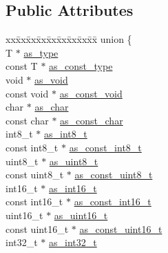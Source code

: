\subsection*{Public Attributes}
\begin{DoxyCompactItemize}
\item 
\begin{tabbing}
xx\=xx\=xx\=xx\=xx\=xx\=xx\=xx\=xx\=\kill
union \{\\
\>T $\ast$ \hyperlink{structcrap_1_1pointer__t_a345d4e69dd07c3dcaacbb462f3d67745}{as\_type}\\
\>const T $\ast$ \hyperlink{structcrap_1_1pointer__t_af40ed86c734355aefae597dd8882386c}{as\_const\_type}\\
\>void $\ast$ \hyperlink{structcrap_1_1pointer__t_a60272c75c04aaafaf6a4339f10d81b32}{as\_void}\\
\>const void $\ast$ \hyperlink{structcrap_1_1pointer__t_a76da0338043bbfc7ed947f18ae843d52}{as\_const\_void}\\
\>char $\ast$ \hyperlink{structcrap_1_1pointer__t_adc5e76f4d3e2f3242b0e0c128e3a018e}{as\_char}\\
\>const char $\ast$ \hyperlink{structcrap_1_1pointer__t_ad90d5ba7cd8c0996aaa5d6ac8e59197d}{as\_const\_char}\\
\>int8\_t $\ast$ \hyperlink{structcrap_1_1pointer__t_a00a337da13cb56f4f649c524af7606b1}{as\_int8\_t}\\
\>const int8\_t $\ast$ \hyperlink{structcrap_1_1pointer__t_a9ce77bbce5a72d780ed726c9c91549d9}{as\_const\_int8\_t}\\
\>uint8\_t $\ast$ \hyperlink{structcrap_1_1pointer__t_abc75378cf1e3c1cb65e93c1a765a5c0b}{as\_uint8\_t}\\
\>const uint8\_t $\ast$ \hyperlink{structcrap_1_1pointer__t_a9501aed2048dbef966d66362b39bc3fe}{as\_const\_uint8\_t}\\
\>int16\_t $\ast$ \hyperlink{structcrap_1_1pointer__t_af49743e61d30272abb1a93697114aaa9}{as\_int16\_t}\\
\>const int16\_t $\ast$ \hyperlink{structcrap_1_1pointer__t_ae390d11f93bef65281220f053dae1b09}{as\_const\_int16\_t}\\
\>uint16\_t $\ast$ \hyperlink{structcrap_1_1pointer__t_a9c9b5ae3d6475830d13c0ab770b9d056}{as\_uint16\_t}\\
\>const uint16\_t $\ast$ \hyperlink{structcrap_1_1pointer__t_a7404877008ee5b52b04d2278c02987ed}{as\_const\_uint16\_t}\\
\>int32\_t $\ast$ \hyperlink{structcrap_1_1pointer__t_a15321a6137835f60c744f2f98a0a3f3d}{as\_int32\_t}\\

\end{tabbing}
\end{DoxyCompactItemize}
